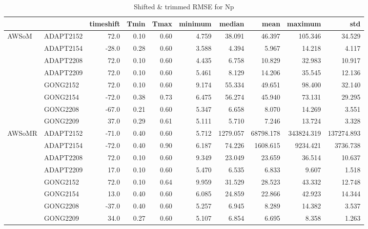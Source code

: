 \begin{table}
\centering
\caption{Shifted \& trimmed RMSE for Np}
\begin{tabular}{llrrrrrrrr}
\toprule
       &          &  timeshift &  Tmin &  Tmax &  minimum &    median &       mean &     maximum &         std \\
\midrule
\multirow{8}{*}{AWSoM} & ADAPT2152 &       72.0 &  0.10 &  0.60 &    4.759 &    38.091 &     46.397 &     105.346 &      34.529 \\
       & ADAPT2154 &      -28.0 &  0.28 &  0.60 &    3.588 &     4.394 &      5.967 &      14.218 &       4.117 \\
       & ADAPT2208 &       72.0 &  0.10 &  0.60 &    4.435 &     6.758 &     10.829 &      32.983 &      10.917 \\
       & ADAPT2209 &       72.0 &  0.10 &  0.60 &    5.461 &     8.129 &     14.206 &      35.545 &      12.136 \\
       & GONG2152 &       72.0 &  0.10 &  0.60 &    9.174 &    55.334 &     49.651 &      98.400 &      32.140 \\
       & GONG2154 &      -72.0 &  0.38 &  0.73 &    6.475 &    56.274 &     45.940 &      73.131 &      29.295 \\
       & GONG2208 &      -67.0 &  0.21 &  0.60 &    5.347 &     6.658 &      8.070 &      14.269 &       3.551 \\
       & GONG2209 &       37.0 &  0.29 &  0.61 &    5.111 &     5.710 &      7.246 &      13.724 &       3.328 \\
\cline{1-10}
\multirow{8}{*}{AWSoMR} & ADAPT2152 &      -71.0 &  0.40 &  0.60 &    5.712 &  1279.057 &  68798.178 &  343824.319 &  137274.893 \\
       & ADAPT2154 &      -72.0 &  0.40 &  0.90 &    6.187 &    74.226 &   1608.615 &    9234.421 &    3736.738 \\
       & ADAPT2208 &       72.0 &  0.10 &  0.60 &    9.349 &    23.049 &     23.659 &      36.514 &      10.637 \\
       & ADAPT2209 &       17.0 &  0.10 &  0.60 &    5.470 &     6.535 &      6.833 &       9.607 &       1.518 \\
       & GONG2152 &       72.0 &  0.10 &  0.64 &    9.959 &    31.529 &     28.523 &      43.332 &      12.748 \\
       & GONG2154 &       13.0 &  0.40 &  0.60 &    6.085 &    24.859 &     22.866 &      42.923 &      14.344 \\
       & GONG2208 &      -37.0 &  0.40 &  0.60 &    5.257 &     6.945 &      8.289 &      14.382 &       3.537 \\
       & GONG2209 &       34.0 &  0.27 &  0.60 &    5.107 &     6.854 &      6.695 &       8.358 &       1.263 \\
\bottomrule
\end{tabular}
\end{table}
